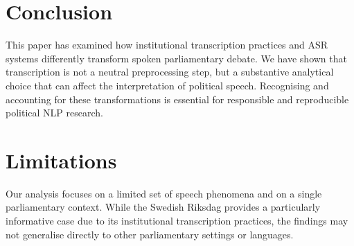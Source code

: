 \documentclass[10pt, a4paper]{article}
\begin{document}
\section{Conclusion}

This paper has examined how institutional transcription practices and ASR systems differently transform spoken parliamentary debate. We have shown that transcription is not a neutral preprocessing step, but a substantive analytical choice that can affect the interpretation of political speech. Recognising and accounting for these transformations is essential for responsible and reproducible political NLP research.

\section{Limitations}

Our analysis focuses on a limited set of speech phenomena and on a single parliamentary context. While the Swedish Riksdag provides a particularly informative case due to its institutional transcription practices, the findings may not generalise directly to other parliamentary settings or languages.
\end{document}
